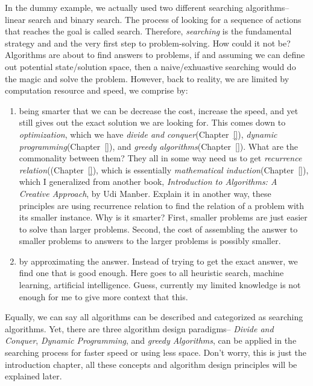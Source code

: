 \documentclass[../main.tex]{subfiles}
\begin{document}
In the dummy example, we actually used two different searching algorithms--linear search and binary search. The process of looking for a sequence of actions that reaches the goal is called search. Therefore, \textit{searching} is the fundamental strategy and and the very first step to problem-solving. How could it not be? Algorithms are about to find answers to problems, if and assuming we can define out potential state/solution space, then a naive/exhuastive searching would do the magic and solve the problem. However, back to reality, we are limited by computation resource and speed, we comprise by:
\begin{enumerate}
    \item being smarter that we can be decrease the cost, increase the speed, and yet still gives out the exact solution we are looking for. This comes down to \textit{optimization}, which we have \textit{divide and conquer}(Chapter~\ref{}), \textit{dynamic programming}(Chapter~\ref{}), and \textit{greedy algorithms}(Chapter~\ref{}). What are the commonality between them? They all in some way need us to get \textit{recurrence relation}((Chapter~\ref{}), which is essentially \textit{mathematical induction}(Chapter~\ref{}), which I generalized from another book, \textit{Introduction to Algorithms: A Creative Approach}, by Udi Manber. Explain it in another way, these principles are using recurrence relation to find the relation of a problem with its smaller instance. Why is it smarter? First, smaller problems are just easier to solve than larger problems. Second, the cost of assembling the answer to smaller problems to answers to the larger problems is possibly smaller.
    \item by approximating the answer. Instead of trying to get the exact answer, we find one that is good enough. Here goes to all heuristic search, machine learning, artificial intelligence. Guess, currently my limited knowledge is not enough for me to give more context that this.
\end{enumerate}
Equally, we can say all algorithms can be described and categorized as searching algorithms. Yet, there are three algorithm design paradigms-- \textit{Divide and Conquer}, \textit{Dynamic Programming}, and \textit{greedy Algorithms}, can be applied in the searching process for faster speed or using less space. 
Don't worry, this is just the introduction chapter, all these concepts and algorithm design principles will be explained later.

\end{document}

